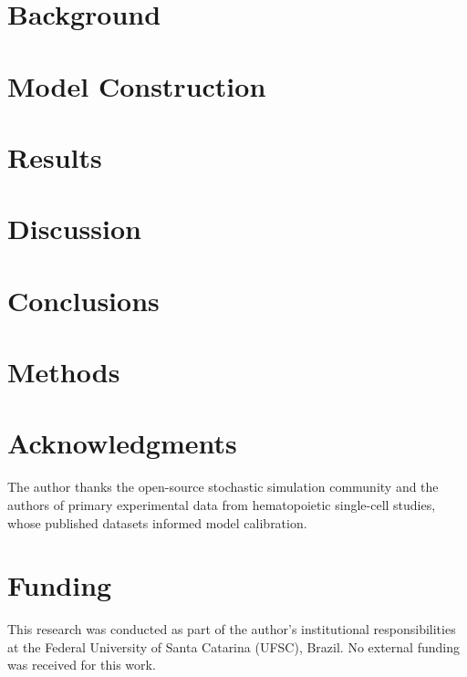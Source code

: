 \documentclass[10pt,letterpaper]{article}
\begin{document}
\section{Background}


\section{Model Construction}
\label{sec:model}


\section{Results}
\label{sec:results}


\section{Discussion}
\label{sec:discussion}


\section{Conclusions}


\section{Methods}
\label{sec:methods}


\section*{Acknowledgments}

The author thanks the open-source stochastic simulation community and the authors of primary experimental data from hematopoietic single-cell studies, whose published datasets informed model calibration.

\section*{Funding}

This research was conducted as part of the author's institutional responsibilities at the Federal University of Santa Catarina (UFSC), Brazil. No external funding was received for this work.
\end{document}
